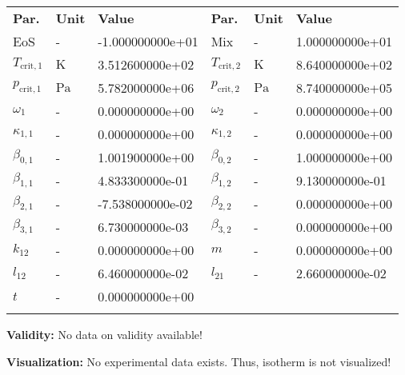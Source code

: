\begin{longtable}[l]{lll|lll}
\toprule
\addlinespace
\textbf{Par.} & \textbf{Unit} & \textbf{Value} &	\textbf{Par.} & \textbf{Unit} & \textbf{Value} \\
\addlinespace
\midrule
\endhead

\bottomrule
\endfoot
\bottomrule
\endlastfoot
\addlinespace

EoS & - & -1.000000000e+01 & Mix & - & 1.000000000e+01 \\
$T_\mathrm{crit,1}$ & $\si{\kelvin}$ & 3.512600000e+02 & $T_\mathrm{crit,2}$ & $\si{\kelvin}$ & 8.640000000e+02 \\
$p_\mathrm{crit,1}$ & $\si{\pascal}$ & 5.782000000e+06 & $p_\mathrm{crit,2}$ & $\si{\pascal}$ & 8.740000000e+05 \\
$\omega_{1}$ & - & 0.000000000e+00 & $\omega_{2}$ & - & 0.000000000e+00 \\
$\kappa_{1,1}$ & - & 0.000000000e+00 & $\kappa_{1,2}$ & - & 0.000000000e+00 \\
$\beta_{0,1}$ & - & 1.001900000e+00 & $\beta_{0,2}$ & - & 1.000000000e+00 \\
$\beta_{1,1}$ & - & 4.833300000e-01 & $\beta_{1,2}$ & - & 9.130000000e-01 \\
$\beta_{2,1}$ & - & -7.538000000e-02 & $\beta_{2,2}$ & - & 0.000000000e+00 \\
$\beta_{3,1}$ & - & 6.730000000e-03 & $\beta_{3,2}$ & - & 0.000000000e+00 \\
$k_{12}$ & - & 0.000000000e+00 & $m$ & - & 0.000000000e+00 \\
$l_{12}$ & - & 6.460000000e-02 & $l_{21}$ & - & 2.660000000e-02 \\
$t$ & - & 0.000000000e+00 & & & \\

\addlinespace\end{longtable}

\textbf{Validity:}
\newline
No data on validity available!
\newline

\textbf{Visualization:}
%
\newline
No experimental data exists. Thus, isotherm is not visualized!
%

\FloatBarrier
\newpage
